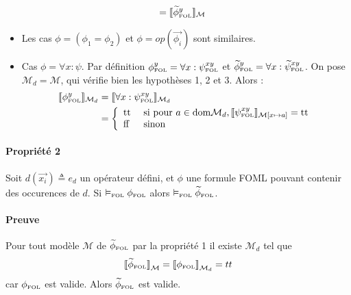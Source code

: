 \documentclass[12pt]{article}
\newcommand{\FOL}{\ensuremath{\textup{\tiny{}FOL}}}
\newcommand{\false}{\textup{ff}}
\newcommand{\true}{\textup{tt}}
\begin{document}
\begin{itemize}
\begin{align*}
    &= \llbracket {\widetilde{\phi}}_\FOL^y \rrbracket_{\mathcal{M}}
  \end{align*}
\item
  Les cas $\phi = (\phi_1 = \phi_2)$ et $\phi = op(\vec{\phi_i})$ sont similaires.
\item
  Cas $\phi = \forall x : \psi$.
  Par définition $\phi_\FOL^y = \forall x : {\psi}_\FOL^{xy}$ et $\widetilde{\phi}_\FOL^y = \forall x : \widetilde{\psi}_\FOL^{xy}$.
  On pose $\mathcal{M}_d = \mathcal{M}$, qui vérifie bien les hypothèses 1, 2 et 3.
  Alors :
  \begin{align*}
    \llbracket \phi_\FOL^y \rrbracket_{\mathcal{M}_d}
    &= \llbracket \forall x : \psi_\FOL^{xy} \rrbracket_{\mathcal{M}_d} \\
    &= \left \{
      \begin{array}{l l}
        \true & \textup{ si pour } a \in \textup{dom} \mathcal{M}_d, \llbracket \psi_\FOL^{xy} \rrbracket_{\mathcal{M}[x \mapsto a]} = \true \\
        \false & \textup{ sinon }
      \end{array}
                 \right .
  \end{align*}
\end{itemize}


\paragraph{Propriété 2}
Soit $d(\vec{x_i}) \triangleq e_d$ un opérateur défini, et $\phi$ une formule FOML pouvant contenir des occurences de $d$.
Si $\vDash_\FOL \phi_\FOL$ alors $\vDash_\FOL \widetilde{\phi}_\FOL$.

\paragraph{Preuve}
Pour tout modèle $\mathcal{M}$ de $\widetilde{\phi}_\FOL$ par la propriété 1 il existe $\mathcal{M}_d$ tel que
\[
  {\llbracket \widetilde{\phi}_\FOL \rrbracket}_{\mathcal{M}} = {\llbracket \phi_\FOL \rrbracket}_{\mathcal{M}_d} = tt
\]
car $\phi_\FOL$ est valide. Alors $\widetilde{\phi}_\FOL$ est valide.
\end{document}
